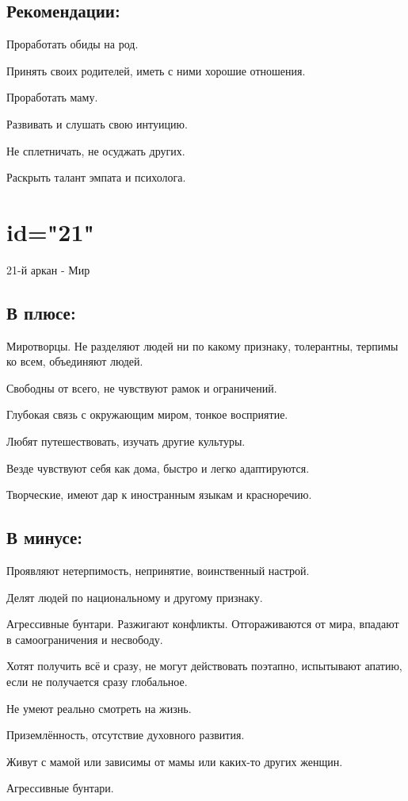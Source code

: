 \subsection{Рекомендации:}
\item Проработать обиды на род.
\item Принять своих родителей, иметь с ними хорошие отношения.
\item Проработать маму.
\item Развивать и слушать свою интуицию.
\item Не сплетничать, не осуджать других.
\item Раскрыть талант эмпата и психолога.
\endsubsection

\endsection

\section{id="21"}{21-й аркан - Мир}

\subsection{В плюсе:}
\item Миротворцы. Не разделяют людей ни по какому признаку, толерантны, терпимы ко всем, объединяют людей.
\item Свободны от всего, не чувствуют рамок и ограничений.
\item Глубокая связь с окружающим миром, тонкое восприятие.
\item Любят путешествовать, изучать другие культуры.
\item Везде чувствуют себя как дома, быстро и легко адаптируются.
\item Творческие, имеют дар к иностранным языкам и красноречию.
\endsubsection

\subsection{В минусе:}
\item Проявляют нетерпимость, непринятие, воинственный настрой.
\item Делят людей по национальному и другому признаку.
\item Агрессивные бунтари. Разжигают конфликты. Отгораживаются от мира, впадают в самоограничения и несвободу.
\item Хотят получить всё и сразу, не могут действовать поэтапно, испытывают апатию, если не получается сразу глобальное.
\item Не умеют реально смотреть на жизнь.
\item Приземлённость, отсутствие духовного развития.
\item Живут с мамой или зависимы от мамы или каких-то других женщин.
\item Агрессивные бунтари.
\endsubsection


